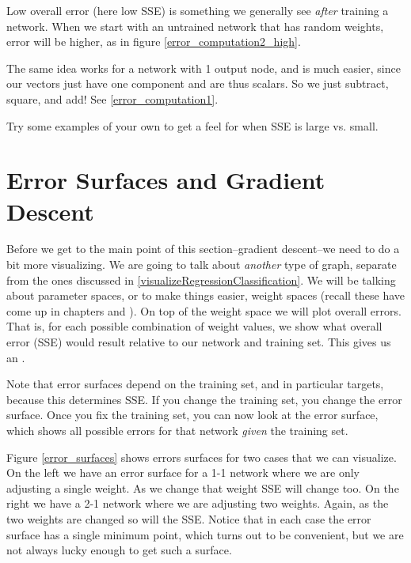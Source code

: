 Low overall error (here low SSE) is something we generally see \emph{after} training a  network. When we start with an untrained network that has random weights, error will be higher, as in figure \ref{error_computation2_high}.

The same idea works for a network with 1 output node, and is much easier, since our vectors just have one component and are thus scalars. So we just subtract, square, and add!  See \ref{error_computation1}.

Try some examples of your own to get a feel for when SSE is large vs. small.

\section{Error Surfaces and Gradient Descent}\label{sect_gradient_descent}

Before we get to the main point of this section--gradient descent--we need to do a bit more visualizing. We are going to talk about \emph{another} type of graph, separate from the ones discussed in \ref{visualizeRegressionClassification}.
We will be talking about parameter spaces, or to make things easier, weight spaces (recall these have come up in chapters  and ). On top of the weight space we will plot overall errors. That is, for each possible combination of weight values, we show what overall error (\eg SSE) would result relative to our network and training set. This  gives us an . 

Note that error surfaces depend on the training set, and in particular targets, because this determines SSE. If you change the training set, you change the error surface. Once you fix the training set, you can now look at the error surface, which shows all possible errors for that network \emph{given} the training set.

Figure \ref{error_surfaces} shows errors surfaces for two cases that we can visualize. On the left we have an error surface for a 1-1 network where we are only adjusting a single weight. As we change that weight SSE will change too. On the right we have a 2-1 network where we are adjusting two weights. Again, as the two weights are changed so will the SSE. Notice that in each case the error surface has a single minimum point, which turns out to be convenient, but we are not always lucky enough to get such a surface.

